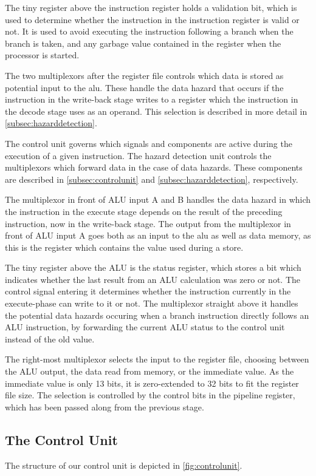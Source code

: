 \documentclass[11pt]{article}
\begin{document}
The tiny register above the instruction register holds a validation
bit, which is used to determine whether the instruction in the
instruction register is valid or not. It is used to avoid executing
the instruction following a branch when the branch is taken, and any
garbage value contained in the register when the processor is started.

The two multiplexors after the register file controls which data is
stored as potential input to the alu. These handle the data hazard
that occurs if the instruction in the write-back stage writes to a
register which the instruction in the decode stage uses as an
operand. This selection is described in more detail in
\autoref{subsec:hazarddetection}. 

The control unit governs which signals and components are active
during the execution of a given instruction. The hazard detection unit
controls the multiplexors which forward data in the case of data
hazards. These components are described in
\autoref{subsec:controlunit} and \autoref{subsec:hazarddetection},
respectively.

The multiplexor in front of ALU input A and B handles the data hazard
in which the instruction in the execute stage depends on the result of
the preceding instruction, now in the write-back stage. The output
from the multiplexor in front of ALU input A goes both as an input to
the alu as well as data memory, as this is the register which contains
the value used during a store.

The tiny register above the ALU is the status register, which stores a
bit which indicates whether the last result from an ALU calculation
was zero or not. The control signal entering it determines whether the
instruction currently in the execute-phase can write to it or not. The
multiplexor straight above it handles the potential data hazards
occuring when a branch instruction directly follows an ALU
instruction, by forwarding the current ALU status to the control unit
instead of the old value.

The right-most multiplexor selects the input to the register file,
choosing between the ALU output, the data read from memory, or the
immediate value. As the immediate value is only 13 bits, it is
zero-extended to 32 bits to fit the register file size. The selection
is controlled by the control bits in the pipeline register, which has
been passed along from the previous stage.

\subsection{The Control Unit}
\label{subsec:controlunit} 
The structure of our control unit is depicted in
\autoref{fig:controlunit}.
\end{document}
